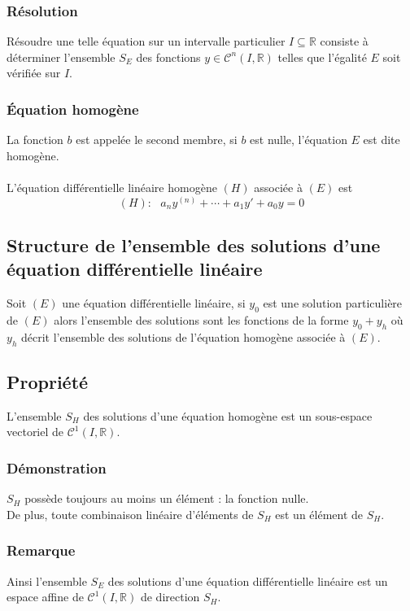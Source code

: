 \documentclass[a4paper,10pt]{book} %
\newcommand{\R}{\mathbb{R}}
\begin{document}
\subsubsection{Résolution}
Résoudre une telle équation sur un intervalle particulier $I\subseteq \R$ consiste à déterminer l'ensemble $S_E$ des fonctions $y\in \mathcal{C}^n(I,\R)$ telles que l'égalité $E$ soit vérifiée sur $I$.

\subsubsection{Équation homogène}
La fonction $b$ est appelée le second membre, si $b$ est nulle, l'équation $E$ est dite homogène.\\\\
L'équation différentielle linéaire homogène $(H)$ associée à $(E)$ est $$(H):\text{ }a_ny^{(n)}+\cdots+a_1y'+a_0y=0$$

\subsection{Structure de l'ensemble des solutions d'une équation différentielle linéaire}
Soit $(E)$ une équation différentielle linéaire, si $y_0$ est une solution particulière de $(E)$ alors l'ensemble des solutions sont les fonctions de la forme $y_0+y_h$ où $y_h$ décrit l'ensemble des solutions de l'équation homogène associée à $(E)$.

\subsection{Propriété}
L'ensemble $S_H$ des solutions d'une équation homogène est un sous-espace vectoriel de $\mathcal{C}^1(I,\R)$.

\subsubsection{Démonstration}
$S_H$ possède toujours au moins un élément : la fonction nulle.\\
De plus, toute combinaison linéaire d'éléments de $S_H$ est un élément de $S_H$.

\subsubsection{Remarque}
Ainsi l'ensemble $S_E$ des solutions d'une équation différentielle linéaire est un espace affine de $\mathcal{C}^1(I,\R)$ de direction $S_H$.
\end{document}

